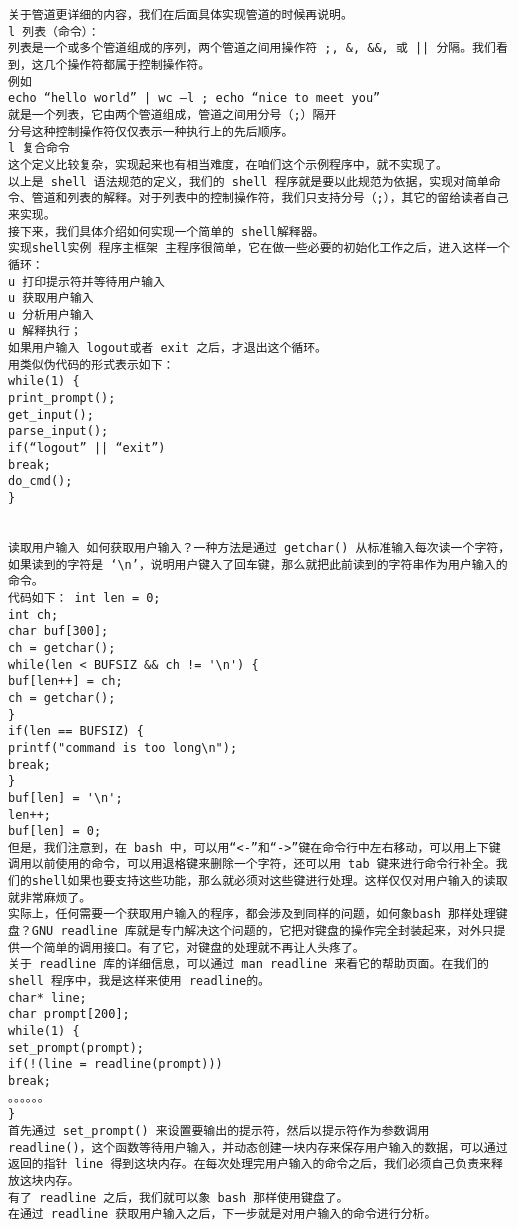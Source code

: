 \begin{lstlisting}
关于管道更详细的内容，我们在后面具体实现管道的时候再说明。 
l 列表（命令）： 
列表是一个或多个管道组成的序列，两个管道之间用操作符 ;, &, &&, 或 || 分隔。我们看到，这几个操作符都属于控制操作符。 
例如 
echo “hello world” | wc –l ; echo “nice to meet you” 
就是一个列表，它由两个管道组成，管道之间用分号（;）隔开 
分号这种控制操作符仅仅表示一种执行上的先后顺序。 
l 复合命令 
这个定义比较复杂，实现起来也有相当难度，在咱们这个示例程序中，就不实现了。 
以上是 shell 语法规范的定义，我们的 shell 程序就是要以此规范为依据，实现对简单命令、管道和列表的解释。对于列表中的控制操作符，我们只支持分号（;），其它的留给读者自己来实现。 
接下来，我们具体介绍如何实现一个简单的 shell解释器。 
实现shell实例 程序主框架 主程序很简单，它在做一些必要的初始化工作之后，进入这样一个循环： 
u 打印提示符并等待用户输入 
u 获取用户输入 
u 分析用户输入 
u 解释执行； 
如果用户输入 logout或者 exit 之后，才退出这个循环。 
用类似伪代码的形式表示如下： 
while(1) { 
print_prompt(); 
get_input(); 
parse_input(); 
if(“logout” || “exit”) 
break; 
do_cmd(); 
} 


读取用户输入 如何获取用户输入？一种方法是通过 getchar() 从标准输入每次读一个字符，如果读到的字符是 ‘\n’，说明用户键入了回车键，那么就把此前读到的字符串作为用户输入的命令。 
代码如下： int len = 0; 
int ch; 
char buf[300]; 
ch = getchar(); 
while(len < BUFSIZ && ch != '\n') { 
buf[len++] = ch; 
ch = getchar(); 
} 
if(len == BUFSIZ) { 
printf("command is too long\n"); 
break; 
} 
buf[len] = '\n'; 
len++; 
buf[len] = 0; 
但是，我们注意到，在 bash 中，可以用“<-”和“->”键在命令行中左右移动，可以用上下键调用以前使用的命令，可以用退格键来删除一个字符，还可以用 tab 键来进行命令行补全。我们的shell如果也要支持这些功能，那么就必须对这些键进行处理。这样仅仅对用户输入的读取就非常麻烦了。 
实际上，任何需要一个获取用户输入的程序，都会涉及到同样的问题，如何象bash 那样处理键盘？GNU readline 库就是专门解决这个问题的，它把对键盘的操作完全封装起来，对外只提供一个简单的调用接口。有了它，对键盘的处理就不再让人头疼了。 
关于 readline 库的详细信息，可以通过 man readline 来看它的帮助页面。在我们的 shell 程序中，我是这样来使用 readline的。 
char* line; 
char prompt[200]; 
while(1) { 
set_prompt(prompt); 
if(!(line = readline(prompt))) 
break; 
。。。。。。 
} 
首先通过 set_prompt() 来设置要输出的提示符，然后以提示符作为参数调用 readline()，这个函数等待用户输入，并动态创建一块内存来保存用户输入的数据，可以通过返回的指针 line 得到这块内存。在每次处理完用户输入的命令之后，我们必须自己负责来释放这块内存。 
有了 readline 之后，我们就可以象 bash 那样使用键盘了。 
在通过 readline 获取用户输入之后，下一步就是对用户输入的命令进行分析。 


\end{lstlisting}
